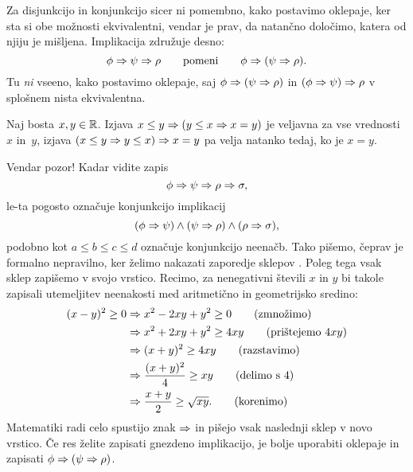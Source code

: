 %
Za disjunkcijo in konjunkcijo sicer ni pomembno, kako postavimo
oklepaje, ker sta si obe možnosti ekvivalentni, vendar je prav,
da natančno določimo, katera od njiju je mišljena.
Implikacija združuje desno:
%
\begin{equation*}
  \phi \Rightarrow \psi \Rightarrow \rho
  \qquad\text{pomeni}\qquad
  \phi \Rightarrow (\psi \Rightarrow \rho).
\end{equation*}
%
Tu \emph{ni} vseeno, kako postavimo oklepaje, saj $\phi \Rightarrow (\psi
\Rightarrow \rho)$ in $(\phi \Rightarrow \psi) \Rightarrow \rho$ v splošnem nista
ekvivalentna.

\begin{zgled}
  Naj bosta $x, y \in \mathbb{R}$. Izjava $x \leq y \Rightarrow (y \leq x \Rightarrow x = y)$ je veljavna za vse vrednosti~$x$ in~$y$,
  izjava $(x \leq y \Rightarrow y \leq x) \Rightarrow x = y$ pa velja natanko tedaj, ko je $x = y$.
\end{zgled}

Vendar pozor! Kadar vidite zapis
%
\begin{equation*}
  \phi \Rightarrow \psi \Rightarrow \rho \Rightarrow \sigma,
\end{equation*}
%
le-ta pogosto označuje konjunkcijo implikacij
%
\begin{equation*}
  (\phi \Rightarrow \psi) \land (\psi \Rightarrow \rho) \land (\rho \Rightarrow \sigma),
\end{equation*}
%
podobno kot $a \leq b \leq c \leq d$ označuje konjunkcijo neenačb.
Tako pišemo, čeprav je formalno nepravilno, ker želimo nakazati zaporedje sklepov
.
Poleg tega vsak sklep zapišemo v svojo vrstico. Recimo, za nenegativni števili $x$ in
$y$ bi takole zapisali utemeljitev neenakosti med aritmetično in
geometrijsko sredino:
%
\begin{align*}
  (x - y)^2 \geq 0
  &\Rightarrow x^2 - 2 x y + y^2 \geq 0
  \tag{zmnožimo}\\
  &\Rightarrow x^2 + 2 x y + y^2 \geq 4 x y
  \tag{prištejemo $4 x y$}\\
  &\Rightarrow (x + y)^2 \geq 4 x y
  \tag{razstavimo}\\
  &\Rightarrow \frac{(x + y)^2}{4} \geq x y
  \tag{delimo s $4$}\\
  &\Rightarrow \frac{x+y}{2} \geq \sqrt{x y}.
  \tag{korenimo}
\end{align*}
%
Matematiki radi celo spustijo znak $\Rightarrow$ in pišejo vsak naslednji sklep v novo vrstico.
%
Če res želite zapisati gnezdeno implikacijo, je bolje uporabiti oklepaje in zapisati $\phi \Rightarrow (\psi
\Rightarrow \rho)$.


